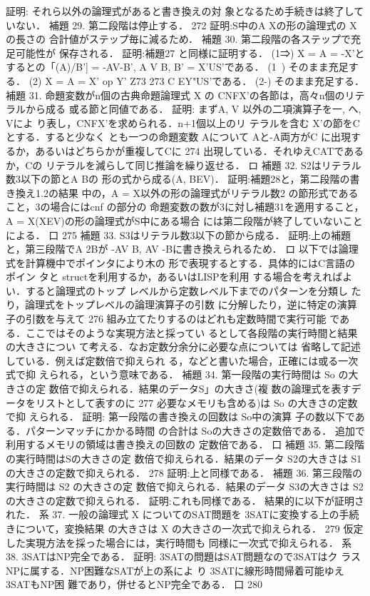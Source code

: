 \documentclass{ltjsarticle}
\theoremstyle{mystyle1}
\theoremstyle{mystyle3}
\theoremstyle{mystyle2}
\begin{document}
証明: それら以外の論理式があると書き換えの対 象となるため手続きは終了していない．
補題 29. 第二段階は停止する．
272
証明:S中のA Xの形の論理式の X の長さの 合計値がステップ毎に減るため．
補題 30. 第二段階の各ステップで充足可能性が 保存される．
証明:補題27 と同様に証明する． (1⇒) X = A = -X'とするとの「(A)/B'] = {-AV-B', A V B, B' = X'}US'である． (1~) そのまま充足する． (2) X = A = X' op Y' Z73%
273
C EY"US'である． (2-) そのまま充足する．
補題 31. 命題変数がn個の古典命題論理式 X の CNFX'の各節は，高々n個のリテラルから成る 或る節と同値である．
証明: まずA, V 以外の二項演算子を一, へ, Vによ り表し，CNFX'を求められる．n+1個以上のリ テラルを含む X'の節をCとする．すると少なく とも一つの命題変数 Aについて Aと-A両方がC に出現するか，あるいはどちらかが重複してCに
274
出現している．それゆえCATであるか，Cの リテラルを減らして同じ推論を繰り返せる． ロ
補題 32. S2はリテラル数3以下の節とA Bの 形の式から成る(A, BEV)．
証明:補題28と，第二段階の書き換え1.2の結果 中の，A = X以外の形の論理式がリテラル数2 の節形式であること，3の場合にはcnf の部分の 命題変数の数が3に対し補題31を適用すること， A = X(XEV)の形の論理式がS中にある場合 には第二段階が終了していないことによる． 口
275
補題 33. S3はリテラル数3以下の節から成る．
証明:上の補題と，第三段階でA 2Bが -AV B, AV -Bに書き換えられるため．
ロ
以下では論理式を計算機中でポインタにより木の 形で表現するとする．具体的にはC言語のポイン タと structを利用するか，あるいはLISPを利用 する場合を考えればよい．すると論理式のトップ レベルから定数レベル下までのパターンを分類し たり，論理式をトップレベルの論理演算子の引数 に分解したり，逆に特定の演算子の引数を与えて
276
組み立てたりするのはどれも定数時間で実行可能 である．ここではそのような実現方法と採ってい るとして各段階の実行時間と結果の大きさについ て考える．なお定数分余分に必要な点については 省略して記述している．例えば定数倍で抑えられ る，などと書いた場合，正確には或る一次式で抑 えられる，という意味である．
補題 34. 第一段階の実行時間は So の大きさの定 数倍で抑えられる．結果のデータS」の大きさ(複 数の論理式を表すデータをリストとして表すのに
277
必要なメモリも含める)は So の大きさの定数で抑 えられる．
証明: 第一段階の書き換えの回数は So中の演算 子の数以下である．パターンマッチにかかる時間 の合計は Soの大きさの定数倍である． 追加で利用するメモリの領域は書き換えの回数の 定数倍である．
口
補題 35. 第二段階の実行時間はSの大きさの定 数倍で抑えられる．結果のデータ S2の大きさは S1の大きさの定数で抑えられる．
278
証明:上と同様である．
補題 36. 第三段階の実行時間は S2 の大きさの定 数倍で抑えられる．結果のデータ S3の大きさは S2 の大きさの定数で抑えられる．
証明:これも同様である．
結果的に以下が証明された．
系 37. 一般の論理式 X についてのSAT問題を 3SATに変換する上の手続きについて，変換結果 の大きさは X の大きさの一次式で抑えられる．
279
仮定した実現方法を採った場合には，実行時間も 同様に一次式で抑えられる．
系 38. 3SATはNP完全である．
証明: 3SATの問題はSAT問題なので3SATはク ラス NPに属する．NP困難なSATが上の系によ り 3SATに線形時間帰着可能ゆえ3SATもNP困 難であり，併せるとNP完全である．
口
280
\end{document}

